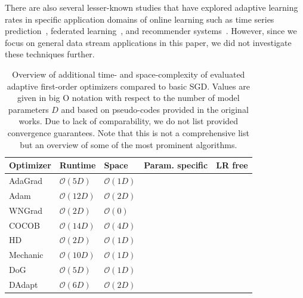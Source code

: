 \documentclass[letterpaper]{article} %
\newcommand{\cmark}{\ding{51}} %
\newcommand{\xmark}{\ding{55}} %
\begin{document}
There are also several lesser-known studies that have explored adaptive learning rates in specific application domains of online learning such as time series prediction~\cite{miyaguchiCograConceptDriftAwareStochastic2019, fekriDeepLearningLoad2021, zhangPOLAOnlineTime2021a}, federated learning~\cite{canonacoAdaptiveFederatedLearning2021}, and recommender systems~\cite{ferreirajoseADADRIFTAdaptiveLearning2020}.
However, since we focus on general data stream applications in this paper, we did not investigate these techniques further. 

\begin{table}[ht]
	\centering
	\small
	\begin{tabular}{@{}lllcc@{}}
		\toprule
		Optimizer               & Runtime            & Space             & Param. specific & LR free \\ \midrule
		AdaGrad                 & $\mathcal{O}(5D)$  & $\mathcal{O}(1D)$ & \cmark          & \xmark  \\
		Adam                    & $\mathcal{O}(12D)$ & $\mathcal{O}(2D)$ & \cmark          & \xmark  \\
		WNGrad                  & $\mathcal{O}(2D)$  & $\mathcal{O}(0)$  & \xmark          & \xmark  \\
		COCOB                   & $\mathcal{O}(14D)$ & $\mathcal{O}(4D)$ & \cmark          & \cmark  \\
		HD \footnotemark[1]     & $\mathcal{O}(2D)$  & $\mathcal{O}(1D)$ & \xmark          & \xmark  \\
		Mechanic                & $\mathcal{O}(10D)$ & $\mathcal{O}(1D)$ & \cmark          & \cmark  \\
		DoG \footnotemark[1]    & $\mathcal{O}(5D)$  & $\mathcal{O}(1D)$ & \xmark          & \cmark  \\
		DAdapt \footnotemark[1] & $\mathcal{O}(6D)$  & $\mathcal{O}(2D)$ & \xmark          & \cmark  \\
		\bottomrule
	\end{tabular}
	\caption{Overview of additional time- and space-complexity of evaluated adaptive first-order optimizers compared to basic SGD. Values are given in big O notation with respect to the number of model parameters $D$ and based on pseudo-codes provided in the original works. Due to lack of comparability, we do not list provided convergence guarantees. Note that this is not a comprehensive list but an overview of some of the most prominent algorithms.}\label{tab:param_free_optims}
\end{table}
\end{document}
